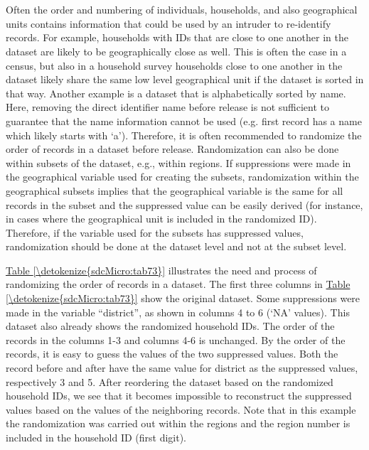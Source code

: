 \documentclass[letterpaper,10pt,english]{sphinxmanual}
\begin{document}
\section{}
\label{\detokenize{sdcMicro:randomizing-order-and-numbering-of-individuals-or-households}}
Often the order and numbering of individuals, households, and also
geographical units contains information that could be used by an
intruder to re-identify records. For example, households with IDs that
are close to one another in the dataset are likely to be geographically
close as well. This is often the case in a census, but also in a
household survey households close to one another in the dataset likely
share the same low level geographical unit if the dataset is sorted in
that way. Another example is a dataset that is alphabetically sorted by
name. Here, removing the direct identifier name before release is not
sufficient to guarantee that the name information cannot be used (e.g.
first record has a name which likely starts with ‘a’). Therefore, it is
often recommended to randomize the order of records in a dataset before
release. Randomization can also be done within subsets of the dataset,
e.g., within regions. If suppressions were made in the geographical
variable used for creating the subsets, randomization within the
geographical subsets implies that the geographical variable is the same
for all records in the subset and the suppressed value can be easily
derived (for instance, in cases where the geographical unit is included
in the randomized ID). Therefore, if the variable used for the subsets
has suppressed values, randomization should be done at the dataset level
and not at the subset level.

\hyperref[\detokenize{sdcMicro:tab73}]{Table \ref{\detokenize{sdcMicro:tab73}}} illustrates the need and process of randomizing the order of
records in a dataset. The first three columns in \hyperref[\detokenize{sdcMicro:tab73}]{Table \ref{\detokenize{sdcMicro:tab73}}} show the
original dataset. Some suppressions were made in the variable
“district”, as shown in columns 4 to 6 (‘NA’ values). This dataset also
already shows the randomized household IDs. The order of the records in
the columns 1-3 and columns 4-6 is unchanged. By the order of the
records, it is easy to guess the values of the two suppressed values.
Both the record before and after have the same value for district as the
suppressed values, respectively 3 and 5. After reordering the dataset
based on the randomized household IDs, we see that it becomes impossible
to reconstruct the suppressed values based on the values of the
neighboring records. Note that in this example the randomization was
carried out within the regions and the region number is included in the
household ID (first digit).
\end{document}

